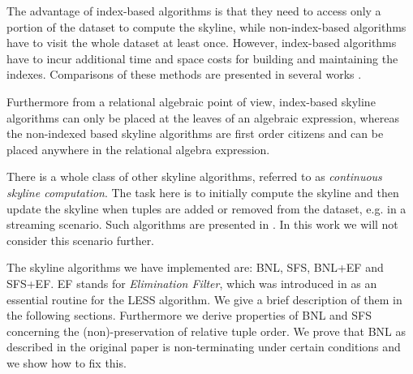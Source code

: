 The advantage of index-based algorithms is that they need to access
only a portion of the dataset to compute the skyline, while
non-index-based algorithms have to visit the whole dataset at least
once.  However, index-based algorithms have to incur additional time
and space costs for building and maintaining the indexes.  Comparisons
of these methods are presented in several works
\citep{Tan2001, Kossmann2002, Chomicki2003}.

Furthermore from a relational algebraic point of view, index-based
skyline algorithms can only be placed at the leaves of an algebraic
expression, whereas the non-indexed based skyline algorithms are first
order citizens and can be placed anywhere in the relational algebra 
expression.

There is a whole class of other skyline algorithms, referred to as
\emph{continuous skyline computation}.  
The task here is to initially compute the skyline and then update the
skyline when tuples are added or removed from the dataset, e.g. in a
streaming scenario. 
Such algorithms are presented in \citep{Lin2005, Tao2006}. In this work
we will not consider this scenario further.
 



The skyline algorithms we have implemented are: BNL, SFS, BNL+EF and
SFS+EF. EF stands for {\em Elimination Filter}, which was introduced
in \citep{Godfrey2005} as an essential routine for the LESS algorithm.
We give a brief description of them in the following sections.
Furthermore we derive properties of BNL and SFS concerning the
(non)-preservation of relative tuple order.  We prove that BNL as
described in the original paper is non-terminating under certain
conditions and we show how to fix this.


